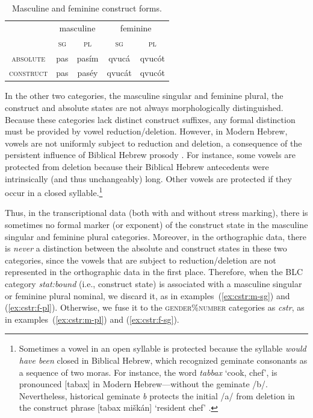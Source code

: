 {\begin{description}
   \begin{table}[t]
      \centering
      \setlength{\extrarowheight}{8pt}
         \small
      \begin{tabular}{ccccc} 
 \toprule
 &  \multicolumn{2}{c}{masculine} & \multicolumn{2}{c}{feminine} \\
 &  \textsc{sg} & \textsc{pl} & \textsc{sg} & \textsc{pl} \\
 \cmidrule{2-3} \cmidrule{4-5}
   \textsc{absolute} & pas & pas\'{i}m  & qvuc\'{a}	& qvuc\'{o}t \\
     \textsc{construct} & pas & pas\'{e}y & qvuc\'{a}t	& qvuc\'{o}t\\
    \bottomrule
    \end{tabular}
        \label{tab:cstr-endings}
     \caption{Masculine and feminine construct forms.}
    \end{table}
    
In the other two categories, the masculine singular and feminine plural, 
the construct and absolute states are not always morphologically distinguished. 
Because these categories lack distinct construct suffixes, any formal distinction must 
be provided by vowel reduction/deletion. However, in Modern Hebrew, vowels are 
not uniformly subject to reduction and deletion, a consequence of the 
persistent influence of Biblical Hebrew prosody \citep{morag:1959, bolozky:1997, ravid-and-shlesinger:2001}. 
For instance, some vowels are protected from deletion because their 
Biblical Hebrew antecedents were intrinsically (and thus unchangeably) long. 
Other vowels are protected if they occur in a closed syllable.\footnote{Sometimes 
a vowel in an open syllable is protected because the syllable \emph{would have been} 
closed in Biblical Hebrew, which recognized geminate consonants as a sequence of two 
moras. For instance, the word \textit{tabbax} `cook, chef', is pronounced [tabax] in Modern Hebrew---without the geminate /b/. Nevertheless, historical geminate \textit{b} protects the initial /a/ from deletion in the construct phrase [tabax  mi\v{s}k\'an] `resident chef' \citep[see][p. 43]{bolozky-and-schwarzwald:1990}.}

Thus, in the transcriptional data (both with and without stress marking), there 
is sometimes no formal marker (or exponent) of the construct state in the masculine singular 
and feminine plural categories. 
Moreover, in the orthographic data, there is \emph{never} a distinction between 
the absolute and construct states in these 
two categories, since the vowels that are subject to reduction/deletion are not represented in the 
orthographic data in the first place.
Therefore, when the BLC category \textit{stat:bound} (i.e., construct state) is associated with a masculine singular or feminine plural nominal, we discard it, as in examples~(\ref{ex:cstr:m-sg}) and (\ref{ex:cstr:f-pl}). Otherwise, we fuse it to the \textsc{gender}\%\textsc{number} categories as \textit{cstr}, as in examples~(\ref{ex:cstr:m-pl}) and 
(\ref{ex:cstr:f-sg}).


\end{description}}
